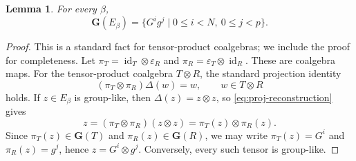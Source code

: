\documentclass[twoside,11pt]{amsart}
\newtheorem{lem}[defi]{Lemma}
\newcommand{\G}{\mathbf{G}}
\newcommand{\id}{\operatorname{id}}
\begin{document}
	\begin{lem}\label{lem:grouplikes-product}
		For every $\beta$,
		\[
		\G(E_\beta)=\{G^ig^j\mid0\le i<N,\ 0\le j<p\}.
		\]
	\end{lem}
	\begin{proof}
		This is a standard fact for tensor-product coalgebras; we include the proof
		for completeness.	Let $\pi_T=\id_T\otimes\varepsilon_R$ and $\pi_R=\varepsilon_T\otimes\id_R$.
		These are coalgebra maps. For the tensor-product coalgebra $T\otimes R$, the
		standard projection identity
		\begin{equation}\label{eq:proj-reconstruction}
			(\pi_T\otimes\pi_R)\Delta(w)=w,\qquad w\in T\otimes R
		\end{equation}
		holds. If $z\in E_\beta$ is group-like, then $\Delta(z)=z\otimes z$, so
		\eqref{eq:proj-reconstruction} gives
		\[
		z=(\pi_T\otimes\pi_R)(z\otimes z)=\pi_T(z)\otimes\pi_R(z).
		\]
		Since $\pi_T(z)\in\G(T)$ and $\pi_R(z)\in\G(R)$, we may write
		$\pi_T(z)=G^i$ and $\pi_R(z)=g^j$, hence $z=G^i\otimes g^j$.
		Conversely, every such tensor is group-like.
	\end{proof}
	
\end{document}

